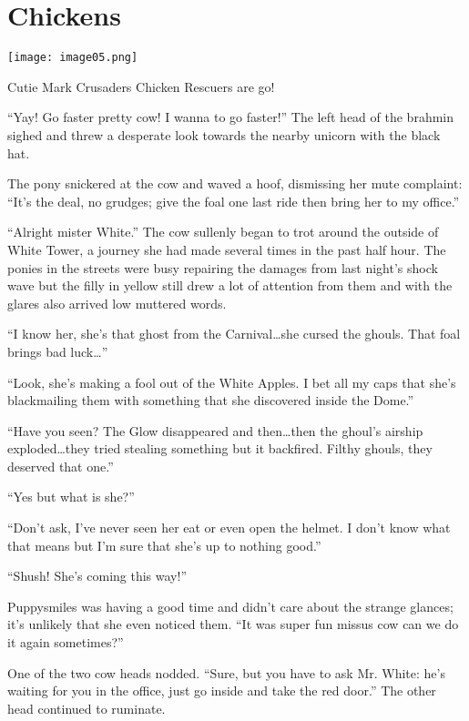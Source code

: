 \chapter{Chickens}

\texttt{[image: image05.png]}

\begin{intro}
    Cutie Mark Crusaders Chicken Rescuers are go!
\end{intro}


``Yay! Go faster pretty cow! I wanna to go faster!'' The left head of the brahmin sighed and threw a desperate look towards the nearby unicorn with the black hat.

The pony snickered at the cow and waved a hoof, dismissing her mute complaint: ``It's the deal, no grudges; give the foal one last ride then bring her to my office.''

``Alright mister White.'' The cow sullenly began to trot around the outside of White Tower, a journey she had made several times in the past half hour. The ponies in the streets were busy repairing the damages from last night's shock wave but the filly in yellow still drew a lot of attention from them and with the glares also arrived low muttered words.

``I know her, she's that ghost from the Carnival\dots she cursed the ghouls. That foal brings bad luck\dots''

``Look, she's making a fool out of the White Apples. I bet all my caps that she's blackmailing them with something that she discovered inside the Dome.''

``Have you seen? The Glow disappeared and then\dots then the ghoul's airship exploded\dots they tried stealing something but it backfired. Filthy ghouls, they deserved that one.''

``Yes but what is she?''

``Don't ask, I've never seen her eat or even open the helmet. I don't know what that means but I'm sure that she's up to nothing good.''

``Shush! She's coming this way!''

Puppysmiles was having a good time and didn't care about the strange glances; it's unlikely that she even noticed them. ``It was super fun missus cow can we do it again sometimes?''

One of the two cow heads nodded. ``Sure, but you have to ask Mr. White: he's waiting for you in the office, just go inside and take the red door.'' The other head continued to ruminate.

